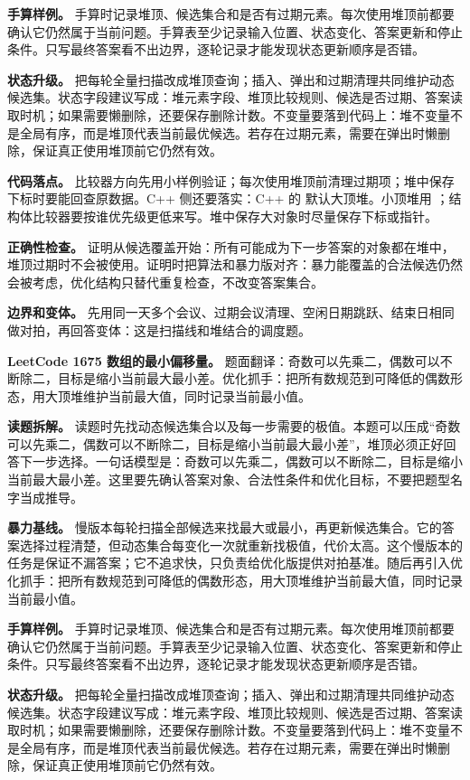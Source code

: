 \textbf{手算样例。} 手算时记录堆顶、候选集合和是否有过期元素。每次使用堆顶前都要确认它仍然属于当前问题。手算表至少记录输入位置、状态变化、答案更新和停止条件。只写最终答案看不出边界，逐轮记录才能发现状态更新顺序是否错。

\textbf{状态升级。} 把每轮全量扫描改成堆顶查询；插入、弹出和过期清理共同维护动态候选集。状态字段建议写成：堆元素字段、堆顶比较规则、候选是否过期、答案读取时机；如果需要懒删除，还要保存删除计数。不变量要落到代码上：堆不变量不是全局有序，而是堆顶代表当前最优候选。若存在过期元素，需要在弹出时懒删除，保证真正使用堆顶前它仍然有效。

\textbf{代码落点。} 比较器方向先用小样例验证；每次使用堆顶前清理过期项；堆中保存下标时要能回查原数据。C++ 侧还要落实：C++ 的  默认大顶堆。小顶堆用 ；结构体比较器要按谁优先级更低来写。堆中保存大对象时尽量保存下标或指针。

\textbf{正确性检查。} 证明从候选覆盖开始：所有可能成为下一步答案的对象都在堆中，堆顶过期时不会被使用。证明时把算法和暴力版对齐：暴力能覆盖的合法候选仍然会被考虑，优化结构只替代重复检查，不改变答案集合。

\textbf{边界和变体。} 先用同一天多个会议、过期会议清理、空闲日期跳跃、结束日相同做对拍，再回答变体：这是扫描线和堆结合的调度题。

\noindent\textbf{LeetCode 1675 数组的最小偏移量。} 题面翻译：奇数可以先乘二，偶数可以不断除二，目标是缩小当前最大最小差。优化抓手：把所有数规范到可降低的偶数形态，用大顶堆维护当前最大值，同时记录当前最小值。

\textbf{读题拆解。} 读题时先找动态候选集合以及每一步需要的极值。本题可以压成“奇数可以先乘二，偶数可以不断除二，目标是缩小当前最大最小差”，堆顶必须正好回答下一步选择。一句话模型是：奇数可以先乘二，偶数可以不断除二，目标是缩小当前最大最小差。这里要先确认答案对象、合法性条件和优化目标，不要把题型名字当成推导。

\textbf{暴力基线。} 慢版本每轮扫描全部候选来找最大或最小，再更新候选集合。它的答案选择过程清楚，但动态集合每变化一次就重新找极值，代价太高。这个慢版本的任务是保证不漏答案；它不追求快，只负责给优化版提供对拍基准。随后再引入优化抓手：把所有数规范到可降低的偶数形态，用大顶堆维护当前最大值，同时记录当前最小值。

\textbf{手算样例。} 手算时记录堆顶、候选集合和是否有过期元素。每次使用堆顶前都要确认它仍然属于当前问题。手算表至少记录输入位置、状态变化、答案更新和停止条件。只写最终答案看不出边界，逐轮记录才能发现状态更新顺序是否错。

\textbf{状态升级。} 把每轮全量扫描改成堆顶查询；插入、弹出和过期清理共同维护动态候选集。状态字段建议写成：堆元素字段、堆顶比较规则、候选是否过期、答案读取时机；如果需要懒删除，还要保存删除计数。不变量要落到代码上：堆不变量不是全局有序，而是堆顶代表当前最优候选。若存在过期元素，需要在弹出时懒删除，保证真正使用堆顶前它仍然有效。

